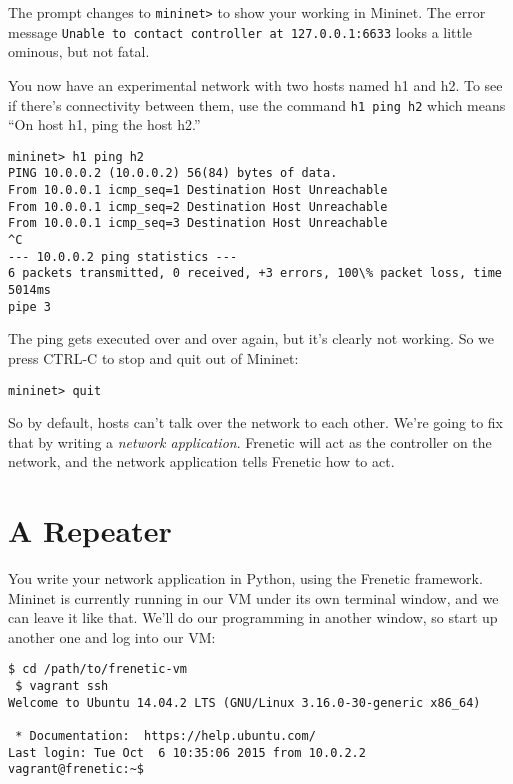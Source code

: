 The prompt changes to {\tt mininet>} to show your working in Mininet.  
The error message {\tt Unable to contact controller at 127.0.0.1:6633} looks a little ominous, but not fatal.  

You now have an experimental network with two hosts named h1 and h2.  
To see if there's connectivity between them, use the command \lstinline{h1 ping h2} which means ``On host h1, ping the host h2.''

\begin{lstlisting}[style=BashInputStyle]
mininet> h1 ping h2
PING 10.0.0.2 (10.0.0.2) 56(84) bytes of data.
From 10.0.0.1 icmp_seq=1 Destination Host Unreachable
From 10.0.0.1 icmp_seq=2 Destination Host Unreachable
From 10.0.0.1 icmp_seq=3 Destination Host Unreachable
^C
--- 10.0.0.2 ping statistics ---
6 packets transmitted, 0 received, +3 errors, 100\% packet loss, time 5014ms
pipe 3
\end{lstlisting}

The ping gets executed over and over again, but it's clearly not working.  So we press CTRL-C to stop and 
quit out of Mininet:

\begin{lstlisting}[style=BashInputStyle]
mininet> quit
\end{lstlisting}

So by default, hosts can't talk over the network to each other.  We're going to fix that by writing a {\it network
application}.    Frenetic will act as the controller on the network, and the network application tells Frenetic how to act.

\section{A Repeater}

You write your network application in Python, using the Frenetic framework.  Mininet is currently running in our VM under its own terminal window, and we can leave it like that.   
We'll do our programming in another window, so start up another one and log into our VM:

\begin{lstlisting}[style=BashInputStyle]
 $ cd /path/to/frenetic-vm
 $ vagrant ssh
Welcome to Ubuntu 14.04.2 LTS (GNU/Linux 3.16.0-30-generic x86_64)

 * Documentation:  https://help.ubuntu.com/
Last login: Tue Oct  6 10:35:06 2015 from 10.0.2.2
vagrant@frenetic:~$ 
\end{lstlisting}

